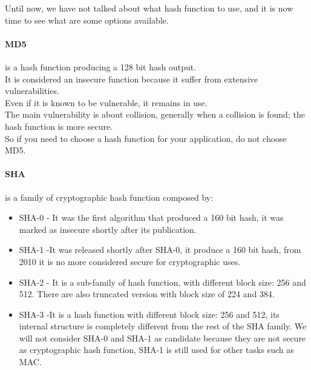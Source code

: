 Until now, we have not talked about what hash function to use, and it is now time to see what are some options available.\\



\paragraph{MD5} is a hash function producing a 128 bit hash output.\\
It is considered an insecure function because it suffer from extensive vulnerabilities.\\
Even if it is known to be vulnerable, it remains in use.\\
The main vulnerability is about collision, generally when a collision is found; the hash function is more secure.\\
So if you need to choose a hash function for your application, do not choose MD5.\\


\paragraph{SHA} is a family of cryptographic hash function composed by:
\begin{itemize}
	\item SHA-0 - It was the first algorithm that produced a 160 bit hash, it was marked as insecure shortly after its publication.
	\item SHA-1 -It was released shortly after SHA-0, it produce a 160 bit hash, from 2010 it is no more considered secure for cryptographic uses.
	\item SHA-2 - It is a sub-family of hash function, with different block size: 256 and 512.
	There are also truncated version with block size of 224 and 384.
	\item SHA-3 -It is a hash function with different block size: 256 and 512, its internal structure is completely different from the rest of the SHA family.
	We will not consider SHA-0 and SHA-1 as candidate because they are not secure as cryptographic hash function, SHA-1 is still used for other tasks such as MAC.
\end{itemize}

